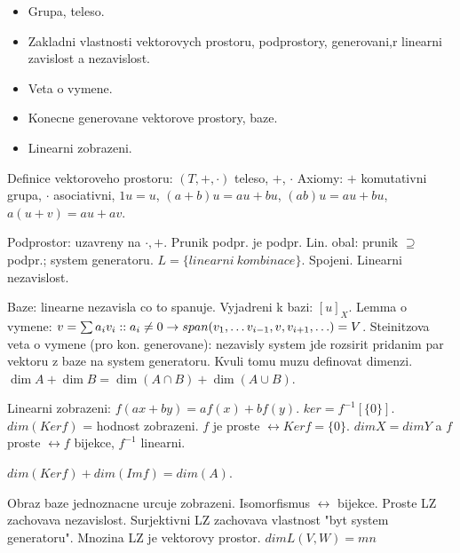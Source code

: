 \begin{itemize}
\item Grupa, teleso.
\item Zakladni vlastnosti vektorovych prostoru, podprostory, generovani,r
	 linearni zavislost a nezavislost.
\item Veta o vymene.
\item Konecne generovane vektorove prostory, baze.
\item Linearni zobrazeni.
\end{itemize}

Definice vektoroveho prostoru: $(T,+,\cdot)$ teleso, $+$, $\cdot$
Axiomy: $+$ komutativni grupa, $\cdot$ asociativni, $1u=u$, $(a+b)u=au+bu$,
$(ab)u=au+bu$, $a(u+v)=au+av$.

Podprostor: uzavreny na $\cdot,+$. Prunik podpr. je podpr.
Lin. obal: prunik $\supseteq$ podpr.; system generatoru.
$L=\{linearni\ kombinace\}$.
Spojeni.
Linearni nezavislost.

Baze: linearne nezavisla co to spanuje. Vyjadreni k bazi: $[u]_X$.
Lemma o vymene: $v=\sum a_i v_i:: a_i\neq 0\rightarrow span(v_1,\ldots
v_{i-1},v,v_{i+1},\ldots)=V$.
Steinitzova veta o vymene (pro kon. generovane): nezavisly system
jde rozsirit pridanim par vektoru z baze na system generatoru.
Kvuli tomu muzu definovat dimenzi. $\dim A+\dim B=\dim(A\cap B)+\dim(A\cup B)$.

Linearni zobrazeni: $f(ax+by)=af(x)+bf(y)$.
$ker=f^{-1}[\{0\}]$. $dim(Ker f)$ = hodnost zobrazeni.
$f$ je proste $\leftrightarrow Ker f=\{0\}$.
$dim X=dim Y$ a $f$ proste $\leftrightarrow f$ bijekce, $f^{-1}$ linearni.

$dim(Ker f)+dim(Im f)=dim(A)$.

Obraz baze jednoznacne urcuje zobrazeni.
Isomorfismus $\leftrightarrow$ bijekce.
Proste LZ zachovava nezavislost.
Surjektivni LZ zachovava vlastnost "byt system generatoru".
Mnozina LZ je vektorovy prostor.
$dim L(V,W)=mn$
